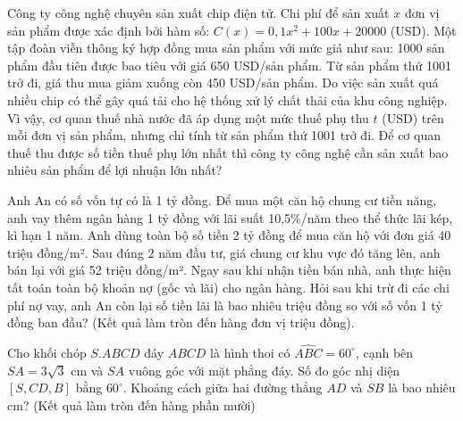 \begin{ex}%
	Công ty công nghệ chuyên sản xuất chip điện tử. Chi phí để sản xuất $x$ đơn vị sản phẩm được xác định bởi hàm số: $C(x)=0{,}1x^2+100x+20000$ (USD). Một tập đoàn viễn thông ký hợp đồng mua sản phẩm với mức giá như sau: 1000 sản phẩm đầu tiên được bao tiêu với giá 650 USD/sản phẩm. Từ sản phẩm thứ 1001 trở đi, giá thu mua giảm xuống còn 450 USD/sản phẩm. Do việc sản xuất quá nhiều chip có thể gây quá tải cho hệ thống xử lý chất thải của khu công nghiệp. Vì vậy, cơ quan thuế nhà nước đã áp dụng một mức thuế phụ thu $t$ (USD) trên mỗi đơn vị sản phẩm, nhưng chỉ tính từ sản phẩm thứ 1001 trở đi. Để cơ quan thuế thu được số tiền thuế phụ lớn nhất thì công ty công nghệ cần sản xuất bao nhiêu sản phẩm để lợi nhuận lớn nhất?
\end{ex}

\begin{ex}%
	Anh An có số vốn tự có là 1 tỷ đồng. Để mua một căn hộ chung cư tiền năng, anh vay thêm ngân hàng 1 tỷ đồng với lãi suất 10,5\%/năm theo thể thức lãi kép, kì hạn 1 năm. Anh dùng toàn bộ số tiền 2 tỷ đồng để mua căn hộ với đơn giá 40 triệu đồng/m². Sau đúng 2 năm đầu tư, giá chung cư khu vực đó tăng lên, anh bán lại với giá 52 triệu đồng/m². Ngay sau khi nhận tiền bán nhà, anh thực hiện tất toán toàn bộ khoản nợ (gốc và lãi) cho ngân hàng. Hỏi sau khi trừ đi các chi phí nợ vay, anh An còn lại số tiền lãi là bao nhiêu triệu đồng so với số vốn 1 tỷ đồng ban đầu? (Kết quả làm tròn đến hàng đơn vị triệu đồng).
\end{ex}

\begin{ex}%
	Cho khối chóp $S.ABCD$ đáy $ABCD$ là hình thoi có $\widehat{ABC}=60^\circ$, cạnh bên $SA=3\sqrt{3}$ cm và $SA$ vuông góc với mặt phẳng đáy. Số đo góc nhị diện $[S,CD,B]$ bằng $60^\circ$. Khoảng cách giữa hai đường thẳng $AD$ và $SB$ là bao nhiêu cm? (Kết quả làm tròn đến hàng phần mười)

\end{ex}



